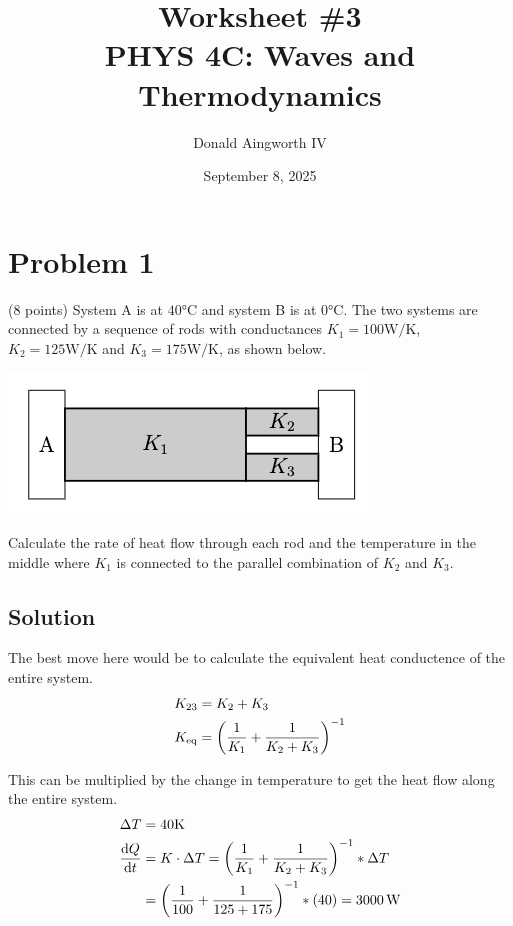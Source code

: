 \documentclass[12pt]{article}
\title{
    Worksheet \#3
    \\  \small
    PHYS 4C: Waves and Thermodynamics
    }
\author{Donald Aingworth IV}
\date{September 8, 2025}
\begin{document}

    \maketitle

    \section{Problem 1}
        (8 points) System A is at $40\unit{\celsius}$ and system B is at $0\unit{\celsius}$. 
        The two systems are connected by a sequence of rods with conductances $K_1 = 100 \unit{\watt/\kelvin}$, $K_2 = 125 \unit{\watt/\kelvin}$ and $K_3 = 175 \unit{\watt/\kelvin}$, as shown below.
        \begin{center}
            \includegraphics{picture_1.png}
        \end{center}

        Calculate the rate of heat ﬂow through each rod and the temperature in the middle where $K_1$ is connected to the parallel combination of $K_2$ and $K_3$.

        \subsection{Solution}
            The best move here would be to calculate the equivalent heat conductence of the entire system.
            \begin{align}
                K_{23}  &=  K_2 + K_3\\
                K_{\rm eq}  &=  \left( \frac{1}{K_1} + \frac{1}{K_2 + K_3} \right)^{-1}
            \end{align}

            This can be multiplied by the change in temperature to get the heat flow along the entire system.
            \begin{align}
                \Delta T    &=  40\unit{\kelvin}\\
                \dv{Q}{t}   &=  K \cdot \Delta T
                    =   \left( \frac{1}{K_1} + \frac{1}{K_2 + K_3} \right)^{-1} * \Delta T\\
                    &=  \left( \frac{1}{100} + \frac{1}{125 + 175} \right)^{-1} * (40)
                    =   3000\,\unit{\watt}
            \end{align}
\end{document}
